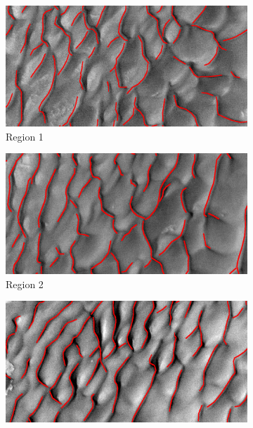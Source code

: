 \begin{figure}[htbp]
	\centering
	\begin{subfigure}[b]{0.3\textwidth}
		\centering
		\includegraphics[width=\textwidth]{figures/area1_with_gt}
		\caption{  Region 1 }
		\label{fig:area1_image}
	\end{subfigure}
	\begin{subfigure}[b]{0.3\textwidth}
		\centering	
		\includegraphics[width=\textwidth]{figures/area2_with_gt}
		\caption{  Region 2 }
		\label{fig:area2_image}
	\end{subfigure}
	\begin{subfigure}[b]{0.3\textwidth}
		\centering
		\includegraphics[width=\textwidth]{figures/area3_with_gt}

\end{subfigure}
\end{figure}
